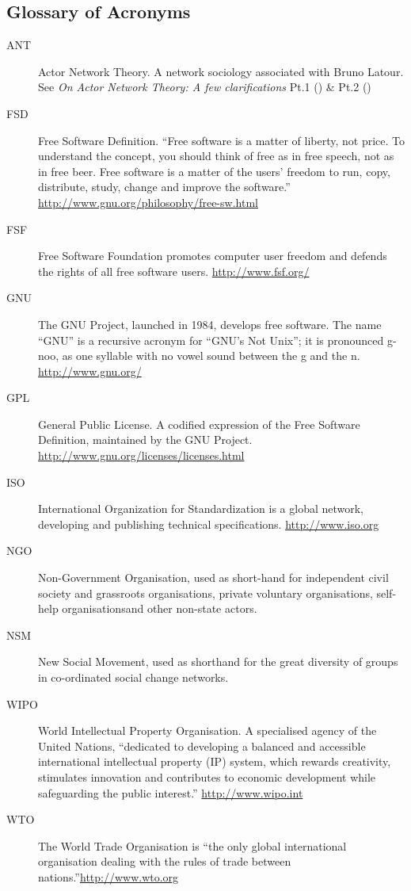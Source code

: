 \documentclass[11pt,titlepage]{book}
\begin{document}
\begin{appendices}
\section{Glossary of Acronyms}
\begin{description}
\item[ANT]{Actor Network Theory. A network sociology associated with Bruno Latour. See \textit{On Actor Network Theory: A few clarifications} Pt.1 (\cite{latour:1998ant1}) \& Pt.2 (\cite{latour:1998ant2})}
\item[FSD]{Free Software Definition. ``Free software is a matter of liberty, not price. To understand the concept, you should think of free as in free speech, not as in free beer. Free software is a matter of the users' freedom to run, copy, distribute, study, change and improve the software.''  \newline\url{http://www.gnu.org/philosophy/free-sw.html}}
\item[FSF]{Free Software Foundation promotes computer user freedom and defends the rights of all free software users.  \newline\url{http://www.fsf.org/}}
\item[GNU]{The GNU Project, launched in 1984, develops free software. The name “GNU” is a recursive acronym for “GNU's Not Unix”; it is pronounced g-noo, as one syllable with no vowel sound between the g and the n.  \newline\url{http://www.gnu.org/}}
\item[GPL]{General Public License. A codified expression of the Free Software Definition, maintained by the GNU Project.  \newline\url{http://www.gnu.org/licenses/licenses.html}}
\item[ISO]{International Organization for Standardization is a global network, developing and publishing technical specifications. \newline\url{http://www.iso.org}}
\item[NGO]{Non-Government Organisation, used as short-hand for independent civil society and grassroots organisations, private voluntary organisations, self-help organisations\linebreak and other non-state actors.}
\item[NSM]{New Social Movement, used as shorthand for the great diversity of groups in co-ordinated social change networks.}
\item[WIPO]{World Intellectual Property Organisation. A specialised agency of the United Nations, ``dedicated to developing a balanced and accessible international intellectual property (IP) system, which rewards creativity, stimulates innovation and contributes to economic development while safeguarding the public interest.''  \newline\url{http://www.wipo.int}}
\item[WTO]{The World Trade Organisation is ``the only global international organisation dealing with the rules of trade between nations.''\newline\url{http://www.wto.org}}
\end{description}
\newpage

\end{appendices}
\end{document}
